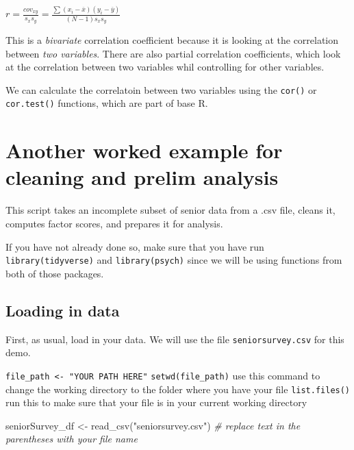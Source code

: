 \documentclass[
]{book}
\newenvironment{Shaded}{\begin{snugshade}}{\end{snugshade}}
\newcommand{\CommentTok}[1]{\textcolor[rgb]{0.56,0.35,0.01}{\textit{#1}}}
\newcommand{\FunctionTok}[1]{\textcolor[rgb]{0.00,0.00,0.00}{#1}}
\newcommand{\NormalTok}[1]{#1}
\newcommand{\OtherTok}[1]{\textcolor[rgb]{0.56,0.35,0.01}{#1}}
\newcommand{\StringTok}[1]{\textcolor[rgb]{0.31,0.60,0.02}{#1}}
\begin{document}
\(r = \frac{cov_{xy}}{s_xs_y} = \frac{\sum(x_i - \overline{x})(y_i - \overline{y})}{(N-1)s_xs_y}\)

This is a \emph{bivariate} correlation coefficient because it is looking at the correlation between \emph{two variables}. There are also partial correlation coefficients, which look at the correlation between two variables whil controlling for other variables.

We can calculate the correlatoin between two variables using the \texttt{cor()} or \texttt{cor.test()} functions, which are part of base R.

\hypertarget{another-worked-example-for-cleaning-and-prelim-analysis}{%
\section{Another worked example for cleaning and prelim analysis}\label{another-worked-example-for-cleaning-and-prelim-analysis}}

This script takes an incomplete subset of senior data from a .csv file, cleans it,
computes factor scores, and prepares it for analysis.

If you have not already done so, make sure that you have run \texttt{library(tidyverse)} and \texttt{library(psych)} since we will be using functions from both of those packages.

\hypertarget{loading-in-data}{%
\subsection{Loading in data}\label{loading-in-data}}

First, as usual, load in your data. We will use the file \texttt{seniorsurvey.csv} for this demo.

\texttt{file\_path\ \textless{}-\ "YOUR\ PATH\ HERE"}
\texttt{setwd(file\_path)} use this command to change the working directory to the folder where you have your file
\texttt{list.files()} run this to make sure that your file is in your current working directory

\begin{Shaded}
\begin{Highlighting}[]
\NormalTok{seniorSurvey\_df }\OtherTok{\textless{}{-}} \FunctionTok{read\_csv}\NormalTok{(}\StringTok{"seniorsurvey.csv"}\NormalTok{) }\CommentTok{\# replace text in the parentheses with your file name}
\end{Highlighting}
\end{Shaded}
\end{document}
